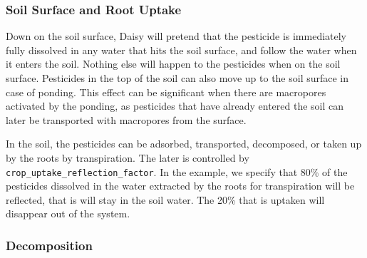 \documentclass[a4paper]{article}
\begin{document}
\subsubsection{Soil Surface and Root Uptake}

Down on the soil surface, Daisy will pretend that the pesticide is
immediately fully dissolved in any water that hits the soil surface,
and follow the water when it enters the soil.  Nothing else will
happen to the pesticides when on the soil surface.  Pesticides in the
top of the soil can also move up to the soil surface in case of
ponding.  This effect can be significant when there are macropores
activated by the ponding, as pesticides that have already entered the
soil can later be transported with macropores from the surface.

In the soil, the pesticides can be adsorbed, transported, decomposed,
or taken up by the roots by transpiration.  The later is controlled by
\linebreak{}\texttt{crop\_uptake\_reflection\_factor}.  In the
example, we specify that 80\% of the pesticides dissolved in the water
extracted by the roots for transpiration will be reflected, that is
will stay in the soil water.  The 20\% that is uptaken will disappear
out of the system.

\subsubsection{Decomposition}
\end{document}
